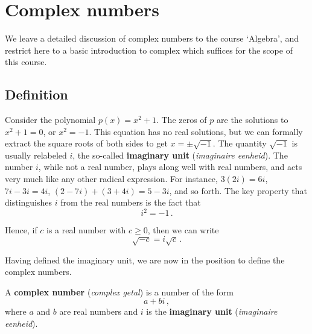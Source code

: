 \fi
\fi

\section{Complex numbers}
\label{sec_complex}
We leave a detailed discussion of complex numbers to the course `Algebra', and restrict here to a basic introduction to complex which suffices for the scope of this course. 
	\checkoddpage
{}

\subsection{Definition}
Consider the polynomial $p(x) = x^2+1$.  The zeros of $p$ are the solutions to $x^2+1=0$, or $x^2=-1$.  This equation has no real solutions, but we can formally extract the square roots of both sides to get  $x = \pm \sqrt{-1}$.  The quantity $\sqrt{-1}$ is usually relabeled $i$, the so-called  \textbf{imaginary unit} (\textit{imaginaire eenheid}).   The number $i$, while not a real number, plays along well with real numbers, and acts very much like any other radical expression.  For instance, $3(2i) = 6i$, $7i-3i = 4i$, $(2-7i) + (3 + 4i) = 5-3i$, and so forth.  The key property that distinguishes $i$ from the real numbers is the fact that  
$$i^2 = -1\,.$$

Hence, if $c$ is a real number with $c \geq 0$, then we can write 
$$\sqrt{-c} = i \sqrt{c}\,.$$

Having defined the imaginary unit, we are now in the position to define the complex numbers.


\begin{definition} \label{complexdefn}
	A \textbf{complex number} (\textit{complex getal}) is a number of the form 
	$$a+bi\,,$$
	where $a$ and $b$ are real numbers and $i$ is the \textbf{imaginary unit} (\textit{imaginaire eenheid}).
\end{definition}

